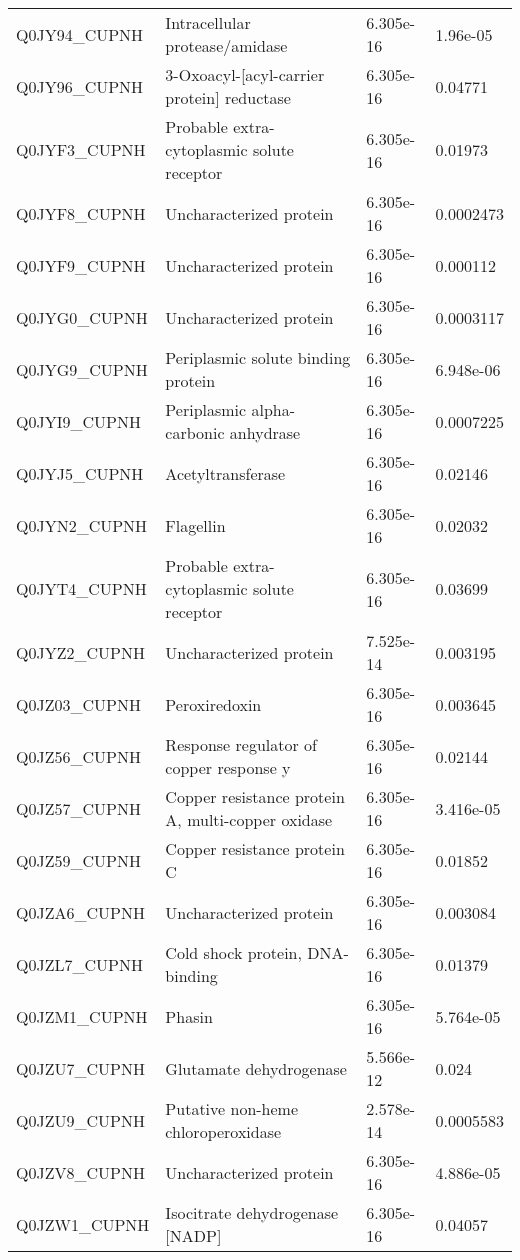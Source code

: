 \begin{center}
\begin{longtable}{ l l l l }
Q0JY94\_CUPNH & Intracellular protease/amidase& 6.305e-16 & 1.96e-05 \\ [0.5ex]
Q0JY96\_CUPNH & 3-Oxoacyl-[acyl-carrier protein] reductase& 6.305e-16 & 0.04771 \\ [0.5ex]
Q0JYF3\_CUPNH & Probable extra-cytoplasmic solute receptor& 6.305e-16 & 0.01973 \\ [0.5ex]
Q0JYF8\_CUPNH & Uncharacterized protein& 6.305e-16 & 0.0002473 \\ [0.5ex]
Q0JYF9\_CUPNH & Uncharacterized protein& 6.305e-16 & 0.000112 \\ [0.5ex]
Q0JYG0\_CUPNH & Uncharacterized protein& 6.305e-16 & 0.0003117 \\ [0.5ex]
Q0JYG9\_CUPNH & Periplasmic solute binding protein& 6.305e-16 & 6.948e-06 \\ [0.5ex]
Q0JYI9\_CUPNH & Periplasmic alpha-carbonic anhydrase& 6.305e-16 & 0.0007225 \\ [0.5ex]
Q0JYJ5\_CUPNH & Acetyltransferase& 6.305e-16 & 0.02146 \\ [0.5ex]
Q0JYN2\_CUPNH & Flagellin& 6.305e-16 & 0.02032 \\ [0.5ex]
Q0JYT4\_CUPNH & Probable extra-cytoplasmic solute receptor& 6.305e-16 & 0.03699 \\ [0.5ex]
Q0JYZ2\_CUPNH & Uncharacterized protein& 7.525e-14 & 0.003195 \\ [0.5ex]
Q0JZ03\_CUPNH & Peroxiredoxin& 6.305e-16 & 0.003645 \\ [0.5ex]
Q0JZ56\_CUPNH & Response regulator of copper response y& 6.305e-16 & 0.02144 \\ [0.5ex]
Q0JZ57\_CUPNH & Copper resistance protein A, multi-copper oxidase& 6.305e-16 & 3.416e-05 \\ [0.5ex]
Q0JZ59\_CUPNH & Copper resistance protein C& 6.305e-16 & 0.01852 \\ [0.5ex]
Q0JZA6\_CUPNH & Uncharacterized protein& 6.305e-16 & 0.003084 \\ [0.5ex]
Q0JZL7\_CUPNH & Cold shock protein, DNA-binding& 6.305e-16 & 0.01379 \\ [0.5ex]
Q0JZM1\_CUPNH & Phasin& 6.305e-16 & 5.764e-05 \\ [0.5ex]
Q0JZU7\_CUPNH & Glutamate dehydrogenase& 5.566e-12 & 0.024 \\ [0.5ex]
Q0JZU9\_CUPNH & Putative non-heme chloroperoxidase& 2.578e-14 & 0.0005583 \\ [0.5ex]
Q0JZV8\_CUPNH & Uncharacterized protein& 6.305e-16 & 4.886e-05 \\ [0.5ex]
Q0JZW1\_CUPNH & Isocitrate dehydrogenase [NADP]& 6.305e-16 & 0.04057 \\ [0.5ex]

\end{longtable}
\end{center}
